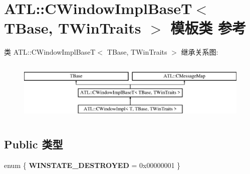 \hypertarget{class_a_t_l_1_1_c_window_impl_base_t}{}\section{A\+TL\+:\+:C\+Window\+Impl\+BaseT$<$ T\+Base, T\+Win\+Traits $>$ 模板类 参考}
\label{class_a_t_l_1_1_c_window_impl_base_t}
类 A\+TL\+:\+:C\+Window\+Impl\+BaseT$<$ T\+Base, T\+Win\+Traits $>$ 继承关系图\+:\begin{figure}[H]
\begin{center}
\leavevmode
\includegraphics[height=2.937063cm]{class_a_t_l_1_1_c_window_impl_base_t}
\end{center}
\end{figure}
\subsection*{Public 类型}
\begin{DoxyCompactItemize}
\item 
\mbox{\label{class_a_t_l_1_1_c_window_impl_base_t_ad3c07f0df84fb6cd01aac9b9848b09ad}} 
enum \{ {\bfseries W\+I\+N\+S\+T\+A\+T\+E\+\_\+\+D\+E\+S\+T\+R\+O\+Y\+ED} = 0x00000001
 \}
\end{DoxyCompactItemize}
